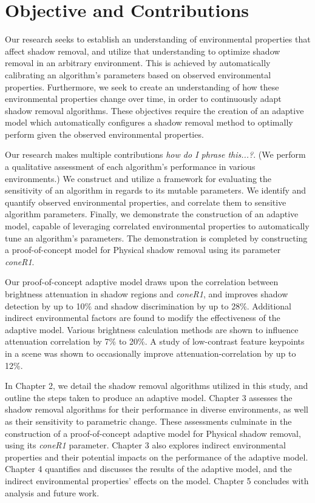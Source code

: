\documentclass[12pt]{report}
\begin{document}

\FloatBarrier
\section{Objective and Contributions}

Our research seeks to establish an understanding of environmental properties that affect shadow removal, and utilize that understanding to optimize shadow removal in an arbitrary environment. This is achieved by automatically calibrating an algorithm's parameters based on observed environmental properties. Furthermore, we seek to create an understanding of how these environmental properties change over time, in order to continuously adapt shadow removal algorithms. These objectives require the creation of an adaptive model which automatically configures a shadow removal method to optimally perform given the observed environmental properties.

Our research makes multiple contributions \textit{how do I phrase this...?}. (We perform a qualitative assessment of each algorithm's performance in various environments.) We construct and utilize a framework for evaluating the sensitivity of an algorithm in regards to its mutable parameters. We identify and quantify observed environmental properties, and correlate them to sensitive algorithm parameters. Finally, we demonstrate the construction of an adaptive model, capable of leveraging correlated environmental properties to automatically tune an algorithm's parameters. The demonstration is completed by constructing a proof-of-concept model for Physical shadow removal using its parameter \textit{coneR1}.

Our proof-of-concept adaptive model draws upon the correlation between brightness attenuation in shadow regions and \textit{coneR1}, and improves shadow detection by up to 10\% and shadow discrimination by up to 28\%. Additional indirect environmental factors are found to modify the effectiveness of the adaptive model. Various brightness calculation methods are shown to influence attenuation correlation by 7\% to 20\%.
A study of low-contrast feature keypoints in a scene was shown to occasionally improve attenuation-correlation by up to 12\%.

In Chapter 2, we detail the shadow removal algorithms utilized in this study, and outline the steps taken to produce an adaptive model. Chapter 3 assesses the shadow removal algorithms for their performance in diverse environments, as well as their sensitivity to parametric change. These assessments culminate in the construction of a proof-of-concept adaptive model for Physical shadow removal, using its \textit{coneR1} parameter. Chapter 3 also explores indirect environmental properties and their potential impacts on the performance of the adaptive model. Chapter 4 quantifies and discusses the results of the adaptive model, and the indirect environmental properties' effects on the model. Chapter 5 concludes with analysis and future work. 
\end{document}
